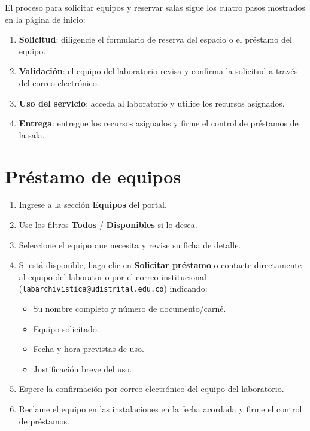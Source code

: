\documentclass[12pt,a4paper]{report}
\begin{document}
El proceso para solicitar equipos y reservar salas sigue los cuatro pasos
mostrados en la página de inicio:

\begin{enumerate}
  \item \textbf{Solicitud}: diligencie el formulario de reserva del espacio o
        el préstamo del equipo.
  \item \textbf{Validación}: el equipo del laboratorio revisa y confirma la
        solicitud a través del correo electrónico.
  \item \textbf{Uso del servicio}: acceda al laboratorio y utilice los recursos
        asignados.
  \item \textbf{Entrega}: entregue los recursos asignados y firme el control de
        préstamos de la sala.
\end{enumerate}

\section{Préstamo de equipos}

\begin{enumerate}
  \item Ingrese a la sección \textbf{Equipos} del portal.
  \item Use los filtros \textbf{Todos} / \textbf{Disponibles} si lo desea.
  \item Seleccione el equipo que necesita y revise su ficha de detalle.
  \item Si está disponible, haga clic en \textbf{Solicitar préstamo} o contacte
        directamente al equipo del laboratorio por el correo institucional
        (\texttt{labarchivistica@udistrital.edu.co}) indicando:
        \begin{itemize}
          \item Su nombre completo y número de documento/carné.
          \item Equipo solicitado.
          \item Fecha y hora previstas de uso.
          \item Justificación breve del uso.
        \end{itemize}
  \item Espere la confirmación por correo electrónico del equipo del
        laboratorio.
  \item Reclame el equipo en las instalaciones en la fecha acordada y firme el
        control de préstamos.
\end{enumerate}
\end{document}
